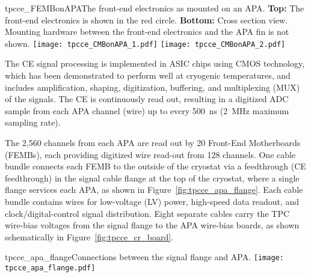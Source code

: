 \begin{cdrfigure}{tpcce_FEMBonAPA}{The 
front-end electronics as mounted on an APA.
  {\bf Top:} The front-end electronics is shown in the red circle.
  {\bf Bottom:} Cross section view. Mounting hardware between the front-end electronics 
and the APA fin is not shown.}
\texttt{[image: tpcce\_CMBonAPA\_1.pdf]}
\texttt{[image: tpcce\_CMBonAPA\_2.pdf]}
\end{cdrfigure}


The CE signal processing is implemented in ASIC chips using CMOS technology,
which has been demonstrated to perform well at cryogenic temperatures,
and includes amplification, shaping, digitization, buffering, and multiplexing (MUX) of the signals.
The CE is continuously read out,
resulting in a digitized ADC sample from each APA channel (wire) up to every 500~ns (2~MHz maximum sampling rate). 

The 2,560 channels from each APA are read out by 20 Front-End Motherboards (FEMBs), each providing 
digitized wire read-out from 128 channels. One cable bundle 
connects each FEMB to the outside of the cryostat via a feedthrough (CE feedthrough) in the signal cable flange at the top of the cryostat, where a single flange services each APA, as shown in Figure~\ref{fig:tpcce_apa_flange}. 
Each cable bundle contains wires for low-voltage (LV) power, high-speed data readout,
and clock/digital-control signal distribution.
Eight separate cables carry the TPC wire-bias voltages from the signal flange to the APA wire-bias boards, as
shown schematically in Figure~\ref{fig:tpcce_cr_board}.

\begin{cdrfigure}{tpcce_apa_flange}{Connections between
the signal flange and APA.}
\texttt{[image: tpcce\_apa\_flange.pdf]}
\end{cdrfigure}

